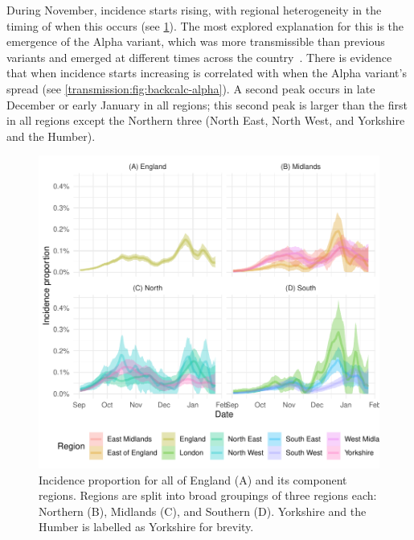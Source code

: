 \documentclass[thesis.tex]{subfiles}
\begin{document}
During November, incidence starts rising, with regional heterogeneity in the timing of when this occurs (see \cref{transmission:fig:backcalc-regions}).
The most explored explanation for this is the emergence of the Alpha variant, which was more transmissible than previous variants and emerged at different times across the country~\autocite{walkerTracking,daviesEstimated,lythgoeLineage}.
There is evidence that when incidence starts increasing is correlated with when the Alpha variant's spread (see \cref{transmission:fig:backcalc-alpha}).
A second peak occurs in late December or early January in all regions; this second peak is larger than the first in all regions except the Northern three (North East, North West, and Yorkshire and the Humber).
\begin{figure}
    \includegraphics{transmission/backcalc-regions}
    \caption[Incidence estimated using backcalculation by region]{%
        Incidence proportion for all of England (A) and its component regions.
        Regions are split into broad groupings of three regions each: Northern (B), Midlands (C), and Southern (D).
        Yorkshire and the Humber is labelled as Yorkshire for brevity.
    }
    \label{transmission:fig:backcalc-regions}
\end{figure}
\end{document}
